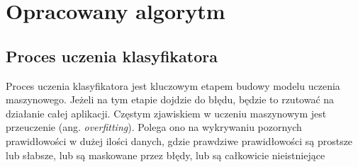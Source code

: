 %



\chapter{Opracowany algorytm}
\label{ch:opracowany-algorytm}


\section{Proces uczenia klasyfikatora}
\label{sec:proces-uczenia-klasyfikatora}
Proces uczenia klasyfikatora jest kluczowym etapem budowy modelu uczenia maszynowego.
Jeżeli na tym etapie dojdzie do błędu, będzie to rzutować na działanie całej aplikacji.
Częstym zjawiskiem w uczeniu maszynowym jest przeuczenie (ang. \textit{overfitting}).
Polega ono na wykrywaniu pozornych prawidłowości w dużej ilości danych, gdzie prawdziwe prawidłowości są prostsze lub słabsze, lub są maskowane przez błędy, lub są całkowicie nieistniejące \cite{overfitting}

